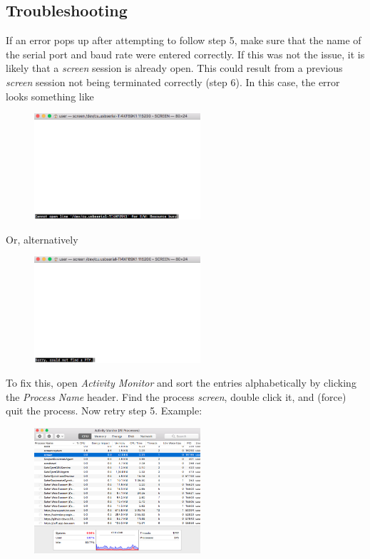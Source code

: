 \documentclass{article}
\begin{document}
\subsection{Troubleshooting}
If an error pops up after attempting to follow step 5, make sure that the name of the serial port and baud rate were entered correctly. If this was not the issue, it is likely that a \textit{screen} session is already open. This could result from a previous \textit{screen} session not being terminated correctly (step 6). In this case, the error looks something like
  \begin{figure}[H]
    \centering
    \includegraphics[width = 0.55\textwidth]{step5_Error.png} 
  \end{figure}
  Or, alternatively
  \begin{figure}[H]
    \centering
    \includegraphics[width = 0.55\textwidth]{step5_Error2.png} 
  \end{figure}
To fix this, open \textit{Activity Monitor} and sort the entries alphabetically by clicking the \textit{Process Name} header. Find the process \textit{screen}, double click it, and (force) quit the process. Now retry step 5.
Example:
  \begin{figure}[H]
    \centering
    \includegraphics[width = 0.55\textwidth]{step5_Error3.png} 
  \end{figure}
\end{document}
